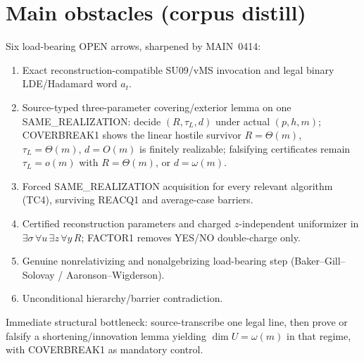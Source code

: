 \documentclass[11pt]{article}
\begin{document}
\section*{Main obstacles (corpus distill)}
Six load-bearing OPEN arrows, sharpened by MAIN~0414:
\begin{enumerate}
\item Exact reconstruction-compatible SU09/vMS invocation and legal binary LDE/Hadamard word $a_t$.
\item Source-typed three-parameter covering/exterior lemma on one SAME\_REALIZATION: decide
$(R,\tau_L,d)$ under actual $(p,h,m)$; COVERBREAK1 shows the linear hostile survivor
$R=\Theta(m)$, $\tau_L=\Theta(m)$, $d=O(m)$ is finitely realizable; falsifying certificates remain
$\tau_L=o(m)$ with $R=\Theta(m)$, or $d=\omega(m)$.
\item Forced SAME\_REALIZATION acquisition for every relevant algorithm (TC4), surviving REACQ1
and average-case barriers.
\item Certified reconstruction parameters and charged $z$-independent uniformizer in
$\exists\sigma\,\forall u\,\exists z\,\forall y\,R$; FACTOR1 removes YES/NO double-charge only.
\item Genuine nonrelativizing and nonalgebrizing load-bearing step
(Baker--Gill--Solovay / Aaronson--Wigderson).
\item Unconditional hierarchy/barrier contradiction.
\end{enumerate}
Immediate structural bottleneck: source-transcribe one legal line, then prove or falsify a
shortening/innovation lemma yielding $\dim U=\omega(m)$ in that regime, with COVERBREAK1 as
mandatory control.
\end{document}
